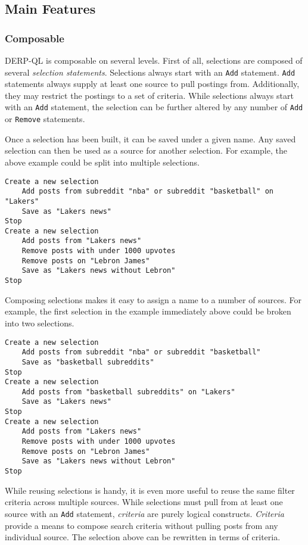 \subsection{Main Features}
\subsubsection{Composable}
DERP-QL is composable on several levels. First of all, selections are composed of several \textit{selection statements}.
Selections always start with an \texttt{Add} statement. \texttt{Add} statements always supply at least one source to pull postings from. Additionally, they may restrict the postings to a set of criteria. While selections always start with an \texttt{Add} statement, the selection can be further altered by any number of \texttt{Add} or \texttt{Remove} statements. 

Once a selection has been built, it can be saved under a given name. Any saved selection can then be used as a source for another selection. For example, the above example could be split into multiple selections.

\begin{lstlisting}
Create a new selection
    Add posts from subreddit "nba" or subreddit "basketball" on "Lakers"
    Save as "Lakers news"
Stop
Create a new selection
    Add posts from "Lakers news"
    Remove posts with under 1000 upvotes
    Remove posts on "Lebron James"
    Save as "Lakers news without Lebron"
Stop
\end{lstlisting}

Composing selections makes it easy to assign a name to a number of sources. For example, the first selection in the example immediately above could be broken into two selections.

\begin{lstlisting}
Create a new selection
    Add posts from subreddit "nba" or subreddit "basketball" 
    Save as "basketball subreddits"
Stop
Create a new selection
    Add posts from "basketball subreddits" on "Lakers"
    Save as "Lakers news"
Stop
Create a new selection
    Add posts from "Lakers news"
    Remove posts with under 1000 upvotes
    Remove posts on "Lebron James"
    Save as "Lakers news without Lebron"
Stop
\end{lstlisting}

While reusing selections is handy, it is even more useful to reuse the same filter criteria across multiple sources.
While selections must pull from at least one source with an \texttt{Add} statement, \textit{criteria} are purely logical constructs. \textit{Criteria} provide a means to compose search criteria without pulling posts from any individual source. The selection above can be rewritten in terms of criteria.

